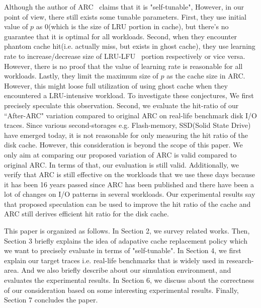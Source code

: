 Although the author of ARC~\cite{arc} claims that it is "self-tunable", However, in our point of view, there still exists some tunable parameters. First, they use initial value of $p$ as 0(which is the size of LRU portion in cache), but there's no guarantee that it is optimal for all workloads. Second, when they encounter phantom cache hit(i.e. actually miss, but exists in ghost cache), they use learning rate to increase/decrease size of LRU-LFU~\cite{lru} portion respectively or vice versa. However, there is no proof that the value of learning rate is reasonable for all workloads. Lastly, they limit the maximum size of $p$ as the cache size in ARC. However, this might loose full utilization of using ghost cache when they encountered a LRU-intensive workload. To investigate these conjectures, We first precisely speculate this observation. Second, we evaluate the hit-ratio of our ``After-ARC" variation compared to original ARC on real-life benchmark disk I/O traces. Since various second-storages e.g. Flash-memory, SSD(Solid State Drive) have emerged today, it is not reasonable for only measuring the hit ratio of the disk cache. However, this consideration is beyond the scope of this paper. We only aim at comparing our proposed variation of ARC is valid compared to original ARC. In terms of that, our evaluation is still valid. Additionally, we verify that ARC is still effective on the workloads that we use these days because it has been 16 years passed since ARC has been published and there have been a lot of changes on I/O patterns in several workloads. Our experimental results say that proposed speculation can be used to improve the hit ratio of the cache and ARC still derives efficient hit ratio for the disk cache.

This paper is organized as follows. In Section 2, we survey related works. Then, Section 3 briefly explains the idea of adapative cache replacement policy which we want to precisely  evaluate in terms of "self-tunable". In Section 4, we first explain our target traces i.e. real-life benchmarks that is widely used in research-area. And we also briefly describe about our simulation environment, and evaluates the experimental results. In Section 6, we discuss about the correctness of our consideration based on some interesting experimental results. Finally, Section 7 concludes the paper.
